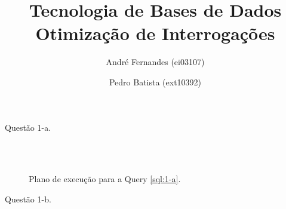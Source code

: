 \documentclass[a4paper,12pt]{article}
\title{Tecnologia de Bases de Dados\\
Otimização de Interrogações}
\author{André Fernandes (ei03107) \and Pedro Batista (ext10392)}
\begin{document}
\maketitle

\begin{program}
   
   \caption{Questão 1-a.}
   \label{sql:1-a}
\end{program}

\begin{figure}[thp]
   \begin{center}
      \\
      \\
   \end{center}
   \caption{Plano de execução para a Query \ref{sql:1-a}.}
   \label{fig:plano_1-a}
\end{figure}

\begin{program}
   
   \caption{Questão 1-b.}
   \label{sql:1-b}
\end{program}
\end{document}
